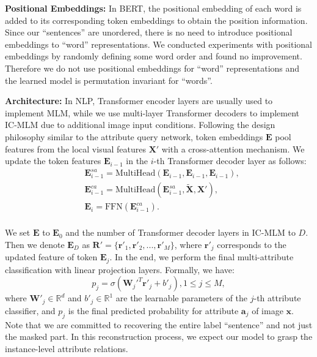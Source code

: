 \documentclass[runningheads]{llncs}
\begin{document}
\textbf{Positional Embeddings:} In BERT, the positional embedding of each word is added to its corresponding token embeddings to obtain the position information.
Since our ``sentences'' are unordered, there is no need to introduce positional embeddings to ``word'' representations. We conducted experiments with positional embeddings by randomly defining some word order and found no improvement. Therefore we do not use positional embeddings for ``word'' representations and the learned model is permutation invariant for ``words''.



\textbf{Architecture:} In NLP, Transformer encoder layers are usually used to implement MLM, while we use multi-layer Transformer decoders to implement IC-MLM due to additional image input conditions. Following the design philosophy similar to the attribute query network, token embeddings $\bm{E}$ pool features from the local visual features $\bm{X}'$ with a cross-attention mechanism. We update the token features $\bm{E}_{i-1}$ in the $i$-th Transformer decoder layer as follows:
\begin{equation}
  \begin{split}
    &\bm{E}_{i-1}^{sa} = \mathrm{MultiHead}(\bm{E}_{i-1},\bm{E}_{i-1},\bm{E}_{i-1}),\\
    &\bm{E}_{i-1}^{ca} =  \mathrm{MultiHead}(\bm{E}_{i-1}^{sa},\bm{\widetilde{X}},\bm{X}'),\\
    &\bm{E}_{i} =  \mathrm{FFN}(\bm{E}_{i-1}^{ca}).\\
  \end{split}
  \label{equ:labeldecoder}
\end{equation}





We set $\bm{E}$ to $\bm{E}_0$ and the number of Transformer decoder layers in IC-MLM to $D$.
Then we denote $\bm{E}_D$ as $\bm{R}' = \{\bm{r}'_{1}, \bm{r}'_{2}, ..., \bm{r}'_{M}\}$, where $\bm{r}'_{j}$ corresponds to the updated feature of token $\bm{E}_j$.
In the end, we perform the final multi-attribute classification with linear projection layers.
Formally, we have:
\begin{equation}
p_{j} = \sigma({\bm{W}_j'}^T \bm{r}'_{j} + b'_{j}),  1 \le j \le M,
\label{equ:labelcls}
\end{equation}
where $\bm{W}'_j \in \mathbb{R}^d$ and $b'_j \in \mathbb{R}^1$ are the learnable parameters of the $j$-th attribute classifier, and $p_{j}$ is the final predicted probability for attribute $\bm{a}_j$ of image $\bm{x}$.
Note that we are committed to recovering the entire label ``sentence'' and not just the masked part. In this reconstruction process, we expect our model to grasp the instance-level attribute relations.
\end{document}
